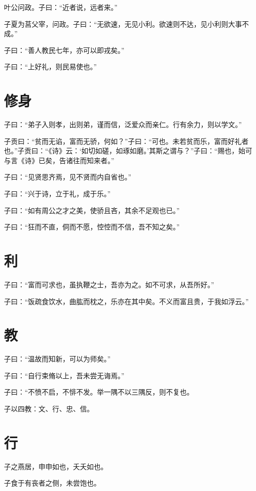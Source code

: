 \documentclass[a5paper]{ctexbook}
\begin{document}
    叶公问政。子曰：“近者说，远者来。”

    子夏为莒父宰，问政。子曰：“无欲速，无见小利。欲速则不达，见小利则大事不成。”

    子曰：“善人教民七年，亦可以即戎矣。”

    子曰：“上好礼，则民易使也。”

    \chapter{修身}

    子曰：“弟子入则孝，出则弟，谨而信，泛爱众而亲仁。行有余力，则以学文。”

    子贡曰：“贫而无谄，富而无骄，何如？”子曰：“可也。未若贫而乐，富而好礼者也。”子贡曰：“《诗》云：‘如切如磋，如琢如磨。’其斯之谓与？”子曰：“赐也，始可与言《诗》已矣，告诸往而知来者。”

    子曰：“见贤思齐焉，见不贤而内自省也。”

    子曰：“兴于诗，立于礼，成于乐。”

    子曰：“如有周公之才之美，使骄且吝，其余不足观也已。”

    子曰：“狂而不直，侗而不愿，悾悾而不信，吾不知之矣。”

    \chapter{利}

    子曰：“富而可求也，虽执鞭之士，吾亦为之。如不可求，从吾所好。”

    子曰：“饭疏食饮水，曲肱而枕之，乐亦在其中矣。不义而富且贵，于我如浮云。”

    \chapter{教}

    子曰：“温故而知新，可以为师矣。”

    子曰：“自行束脩以上，吾未尝无诲焉。”

    子曰：“不愤不启，不悱不发。举一隅不以三隅反，则不复也。

    子以四教：文、行、忠、信。

    \chapter{行}

    子之燕居，申申如也，夭夭如也。

    子食于有丧者之侧，未尝饱也。
\end{document}
